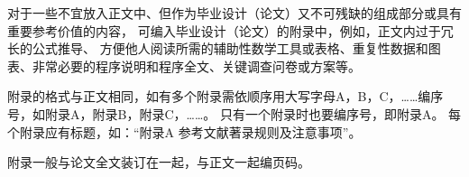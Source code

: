 对于一些不宜放入正文中、但作为毕业设计（论文）又不可残缺的组成部分或具有重要参考价值的内容，
可编入毕业设计（论文）的附录中，例如，正文内过于冗长的公式推导、
方便他人阅读所需的辅助性数学工具或表格、重复性数据和图表、非常必要的程序说明和程序全文、关键调查问卷或方案等。

附录的格式与正文相同，如有多个附录需依顺序用大写字母A，B，C，……编序号，如附录A，附录B，附录C，……。
只有一个附录时也要编序号，即附录A。
每个附录应有标题，如：“附录A 参考文献著录规则及注意事项”。

附录一般与论文全文装订在一起，与正文一起编页码。
